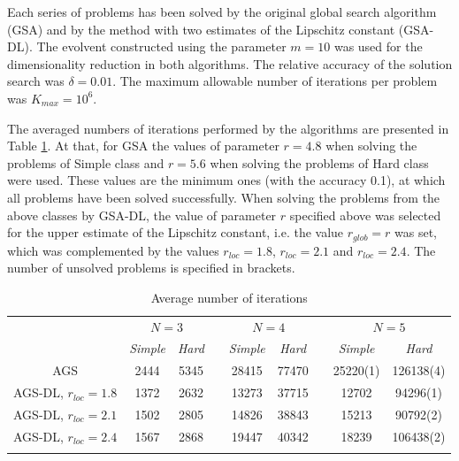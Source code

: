 \documentclass[runningheads]{llncs}
\begin{document}
Each series of problems has been solved by the original global search algorithm (GSA) and by the method with two estimates of the Lipschitz constant (GSA-DL). The evolvent constructed using the parameter $m = 10$ was used for the dimensionality reduction in both algorithms. The relative accuracy of the solution search was $\delta = 0.01$. 
The maximum allowable number of iterations per problem was $K_{max} = 10^6$.

The averaged numbers of iterations performed by the algorithms are presented in Table \ref{tab:1}.
At that, for GSA the values of parameter $r=4.8$ when solving the problems of Simple class and $r=5.6$ when solving the problems of Hard class were used. 
These values are the minimum ones (with the accuracy 0.1), at which all problems have been solved successfully.
When solving the problems from the above classes by GSA-DL, the value of parameter $r$ specified above was selected for the upper estimate of the Lipschitz constant, i.e. the value $r_{glob} = r$ was set, which was complemented by the values $r_{loc}=1.8$, $r_{loc}=2.1$ and $r_{loc}=2.4$. 
The number of unsolved problems is specified in brackets.

\begin{table}
	\caption{Average number of iterations}
	\label{tab:1}
	\center
	\begin{tabular}{ccccccccc}
		\hline\noalign{\smallskip}
		 & \multicolumn{2}{c}{$N=3$} & & \multicolumn{2}{c}{$N=4$} & & \multicolumn{2}{c}{$N=5$}  \\
		\noalign{\smallskip} \cline{2-3} \cline{5-6} \cline{8-9} \noalign{\smallskip}
		 & \textit{Simple} & \textit{Hard} & & \textit{Simple} & \textit{Hard} & & \textit{Simple} & \textit{Hard}  \\
		\noalign{\smallskip} \hline \noalign{\smallskip}
									AGS	&	2444	&	5345	& &	28415	&	77470	& & 25220(1) & 126138(4)		\\
AGS-DL, $r_{loc}=1.8$	&	1372	&	2632	& &	13273	&	37715	& &	12702    & 94296(1)			\\
AGS-DL, $r_{loc}=2.1$	&	1502	&	2805	& &	14826	&	38843	& &	15213    & 90792(2)			\\
AGS-DL, $r_{loc}=2.4$	&	1567	&	2868	& &	19447	&	40342	& &	18239    & 106438(2)		\\
		\noalign{\smallskip}\hline
	\end{tabular}
\end{table}
\end{document}
